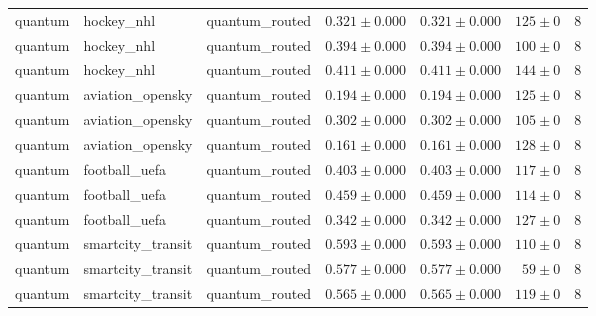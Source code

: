\begin{table}[htbp]
\begin{tabular}{l l l r r r r}
quantum & hockey\_nhl & quantum\_routed & $0.321\pm0.000$ & $0.321\pm0.000$ & $125\pm0$ & 8 \\
quantum & hockey\_nhl & quantum\_routed & $0.394\pm0.000$ & $0.394\pm0.000$ & $100\pm0$ & 8 \\
quantum & hockey\_nhl & quantum\_routed & $0.411\pm0.000$ & $0.411\pm0.000$ & $144\pm0$ & 8 \\
quantum & aviation\_opensky & quantum\_routed & $0.194\pm0.000$ & $0.194\pm0.000$ & $125\pm0$ & 8 \\
quantum & aviation\_opensky & quantum\_routed & $0.302\pm0.000$ & $0.302\pm0.000$ & $105\pm0$ & 8 \\
quantum & aviation\_opensky & quantum\_routed & $0.161\pm0.000$ & $0.161\pm0.000$ & $128\pm0$ & 8 \\
quantum & football\_uefa & quantum\_routed & $0.403\pm0.000$ & $0.403\pm0.000$ & $117\pm0$ & 8 \\
quantum & football\_uefa & quantum\_routed & $0.459\pm0.000$ & $0.459\pm0.000$ & $114\pm0$ & 8 \\
quantum & football\_uefa & quantum\_routed & $0.342\pm0.000$ & $0.342\pm0.000$ & $127\pm0$ & 8 \\
quantum & smartcity\_transit & quantum\_routed & $0.593\pm0.000$ & $0.593\pm0.000$ & $110\pm0$ & 8 \\
quantum & smartcity\_transit & quantum\_routed & $0.577\pm0.000$ & $0.577\pm0.000$ & $59\pm0$ & 8 \\
quantum & smartcity\_transit & quantum\_routed & $0.565\pm0.000$ & $0.565\pm0.000$ & $119\pm0$ & 8 \\
\hline
\end{tabular}
\end{table}
